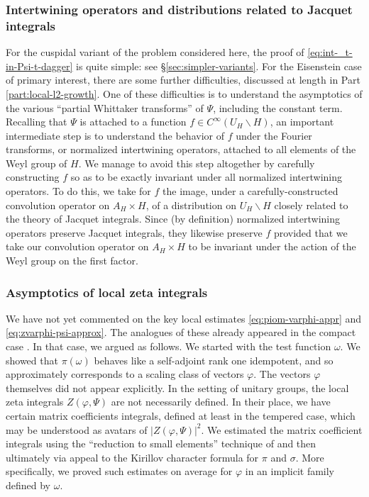 \subsubsection{Intertwining operators and distributions related to Jacquet integrals}\label{sec:intertw-oper-distr}
For the cuspidal variant of the problem considered here, the proof of \eqref{eq:int-_t-in-Psi-t-dagger} is quite simple: see \S\ref{sec:simpler-variants}.  For the Eisenstein case of primary interest, there are some further difficulties, discussed at length in Part \ref{part:local-l2-growth}.  One of these difficulties is to understand the asymptotics of the various ``partial Whittaker transforms'' of $\Psi$, including the constant term.  Recalling that $\Psi$ is attached to a function $f \in C^\infty(U_H \backslash H)$, an important intermediate step is to understand the behavior of $f$ under the Fourier transforms, or normalized intertwining operators, attached to all elements of the Weyl group of $H$.  We manage to avoid this step altogether by carefully constructing $f$ so as to be exactly invariant under all normalized intertwining operators.  To do this, we take for $f$ the image, under a carefully-constructed convolution operator on $A_H \times H$, of a distribution on $U_H \backslash H$ closely related to the theory of Jacquet integrals.  Since (by definition) normalized intertwining operators preserve Jacquet integrals, they likewise preserve $f$ provided that we take our convolution operator on $A_H \times H$ to be invariant under the action of the Weyl group on the first factor.


\subsubsection{Asymptotics of local zeta integrals}\label{sec:asympt-local-zeta}
We have not yet commented on the key local estimates \eqref{eq:piom-varphi-appr} and \eqref{eq:zvarphi-psi-approx}.  The analogues of these already appeared in the compact case \cite{2020arXiv201202187N}.  In that case, we argued as follows.  We started with the test function $\omega$.  We showed that $\pi(\omega)$ behaves like a self-adjoint rank one idempotent, and so approximately corresponds to a scaling class of vectors $\varphi$.  The vectors $\varphi$ themselves did not appear explicitly.  In the setting of unitary groups, the local zeta integrals $Z(\varphi, \Psi)$ are not necessarily defined.  In their place, we have certain matrix coefficients integrals, defined at least in the tempered case, which may be understood as avatars of $|Z(\varphi,\Psi)|^2$.  We estimated the matrix coefficient integrals using the ``reduction to small elements'' technique of \cite[\S19]{nelson-venkatesh-1} and then ultimately via appeal to the Kirillov character formula for $\pi$ and $\sigma$.  More specifically, we proved such estimates on average for $\varphi$ in an implicit family defined by $\omega$.


